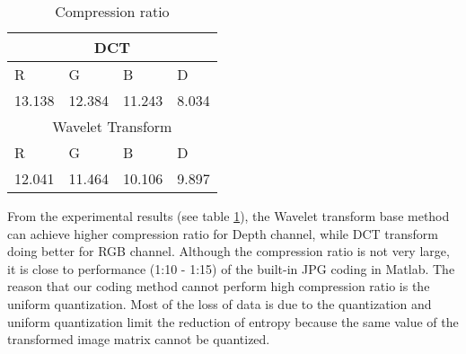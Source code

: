 \begin{table}
\center
\begin{tabular}{|l|l|l|l|}\hline
\multicolumn{4}{|c|}{DCT} \\\hline
R & G & B & D  \\\hline
13.138 & 12.384 & 11.243 & 8.034 \\\hline
\multicolumn{4}{|c|}{Wavelet Transform} \\\hline
R & G & B & D  \\\hline
12.041 & 11.464 & 10.106 & 9.897 \\\hline
\end{tabular}
\caption{Compression ratio}
\label{tab:compressionratio}
\end{table}


From the experimental results (see table \ref{tab:compressionratio}), the Wavelet transform base method can achieve higher compression ratio for Depth channel, while DCT transform doing better for RGB channel. 
Although the compression ratio is not very large, it is close to performance (1:10 - 1:15) of the built-in JPG coding in Matlab. 
The reason that our coding method cannot perform high compression ratio is the uniform quantization. 
Most of the loss of data is due to the quantization and uniform quantization limit the reduction of entropy because the same value of the transformed image matrix cannot be quantized.